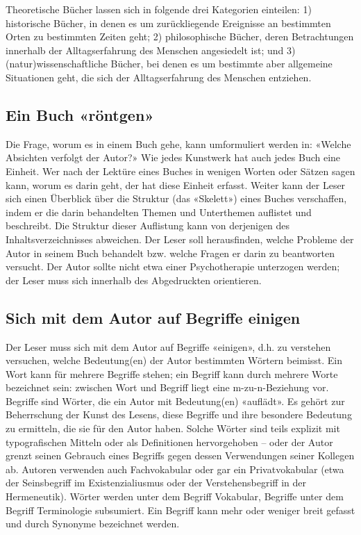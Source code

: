 \documentclass[a4paper,12pt]{scrartcl}
\begin{document}
Theoretische Bücher lassen sich in folgende drei Kategorien einteilen: 1) historische Bücher, in denen es um zurückliegende Ereignisse an bestimmten Orten zu bestimmten Zeiten geht; 2) philosophische Bücher, deren Betrachtungen innerhalb der Alltagserfahrung des Menschen angesiedelt ist; und 3) (natur)wissenschaftliche Bücher, bei denen es um bestimmte aber allgemeine Situationen geht, die sich der Alltagserfahrung des Menschen entziehen.

\subsection{Ein Buch «röntgen»}

Die Frage, worum es in einem Buch gehe, kann umformuliert werden in: «Welche Absichten verfolgt der Autor?» Wie jedes Kunstwerk hat auch jedes Buch eine Einheit. Wer nach der Lektüre eines Buches in wenigen Worten oder Sätzen sagen kann, worum es darin geht, der hat diese Einheit erfasst. Weiter kann der Leser sich einen Überblick über die Struktur (das «Skelett») eines Buches verschaffen, indem er die darin behandelten Themen und Unterthemen auflistet und beschreibt. Die Struktur dieser Auflistung kann von derjenigen des Inhaltsverzeichnisses abweichen. Der Leser soll herausfinden, welche Probleme der Autor in seinem Buch behandelt bzw. welche Fragen er darin zu beantworten versucht. Der Autor sollte nicht etwa einer Psychotherapie unterzogen werden; der Leser muss sich innerhalb des Abgedruckten orientieren.

\subsection{Sich mit dem Autor auf Begriffe einigen}

Der Leser muss sich mit dem Autor auf Begriffe «einigen», d.h. zu verstehen versuchen, welche Bedeutung(en) der Autor bestimmten Wörtern beimisst. Ein Wort kann für mehrere Begriffe stehen; ein Begriff kann durch mehrere Worte bezeichnet sein: zwischen Wort und Begriff liegt eine m-zu-n-Beziehung vor. Begriffe sind Wörter, die ein Autor mit Bedeutung(en) «auflädt». Es gehört zur Beherrschung der Kunst des Lesens, diese Begriffe und ihre besondere Bedeutung zu ermitteln, die sie für den Autor haben. Solche Wörter sind teils explizit mit typografischen Mitteln oder als Definitionen hervorgehoben – oder der Autor grenzt seinen Gebrauch eines Begriffs gegen dessen Verwendungen seiner Kollegen ab. Autoren verwenden auch Fachvokabular oder gar ein Privatvokabular (etwa der Seinsbegriff im Existenzialiusmus oder der Verstehensbegriff in der Hermeneutik). Wörter werden unter dem Begriff Vokabular, Begriffe unter dem Begriff Terminologie subsumiert. Ein Begriff kann mehr oder weniger breit gefasst und durch Synonyme bezeichnet werden.
\end{document}
